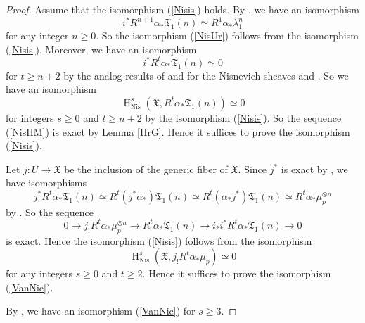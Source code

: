 \documentclass{article}
\newcommand{\Nis}{\mathrm{Nis}}
\newcommand{\HO}{\operatorname{H}}
\begin{document}
%
\begin{proof}\upshape
Assume that the isomorphism (\ref{Nisis}) holds. 
By \cite[Theorem 1.2 and Theorem 1.4]{Sak4}, 
we have an isomorphism
%
\begin{equation}\label{isoTla}
i^{*}R^{n+1}\alpha_{*}\mathfrak{T}_{1}(n)
\simeq
R^{1}\alpha_{*}\lambda_{1}^{n}
\end{equation}
%
for any integer $n\geq 0$. So the isomorphism (\ref{NisUr}) follows from
the isomorphism (\ref{Nisis}). Moreover, we have an isomorphism
%
\begin{equation*}
i^{*}R^{t}\alpha_{*}\mathfrak{T}_{1}(n)
\simeq 0
\end{equation*}
%
for $t\geq n+2$ by the analog results of 
\cite[p.69, II, Theorem 3.2]{M} and 
\cite[p.88, III, Theorem 1.15]{M} 
for the Nisnevich sheaves 
and \cite[Expos\'{e} X, Th\'{e}or\`{e}me 5.1]{SGA4}. So we
have an isomorphism
%
\begin{equation*}
\HO^{s}_{\Nis}(
\mathfrak{X}, 
R^{t}\alpha_{*}\mathfrak{T}_{1}(n)
)    
\simeq
0
\end{equation*}
%
for integers $s\geq 0$ and $t\geq n+2$ by the isomorphism (\ref{Nisis}). So the sequence (\ref{NisHM}) is exact by Lemma \ref{HrG}. 
Hence it suffices to prove the isomorphism (\ref{Nisis}).


Let $j: U\to \mathfrak{X}$ be the inclusion of the generic fiber of $\mathfrak{X}$. 
Since $j^{*}$ is exact by \cite[p.76, II, Proposition 3.14 (b)]{M}, 
we have isomorphisms
%
\begin{equation*}
j^{*}R^{t}\alpha_{*}\mathfrak{T}_{1}(n)
\simeq
R^{t}(j^{*}\alpha_{*})\mathfrak{T}_{1}(n)
\simeq
R^{t}(\alpha_{*}j^{*})\mathfrak{T}_{1}(n)
\simeq
R^{t}\alpha_{*}\mu_{p}^{\otimes n}
\end{equation*}
by \cite[p.776, Proposition 2.2 a)]{Ge}. So the sequence
%
\begin{equation*}
0\to    
j_{!}R^{t}\alpha_{*}\mu_{p}^{\otimes n}
\to
R^{t}\alpha_{*}\mathfrak{T}_{1}(n)
\to
i_{*}i^{*}
R^{t}\alpha_{*}\mathfrak{T}_{1}(n)
\to 0
\end{equation*}
%
is exact.
Hence the isomorphism (\ref{Nisis})
follows from the isomorphism
%
\begin{equation}\label{VanNic}
\HO^{s}_{\Nis}
(
\mathfrak{X}, 
j_{!}R^{t}\alpha_{*}\mu_{p}
)
\simeq 0    
\end{equation}
%
for any integers $s\geq 0$ and $t\geq 2$. Hence it suffices to prove the isomorphism (\ref{VanNic}).

By \cite[p.279--280, 1.32. Theorem]{Ni}, we have an isomorphism (\ref{VanNic}) for $s\geq 3$.


\end{proof}
\end{document}
